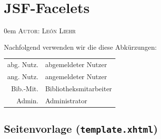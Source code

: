 \documentclass{article}
\makeatletter
\newcommand{\sectionauthor}[1]{
	{\parindent 0em \large \scshape Autor: #1 \par \nobreak \vspace*{1em}}
	\@afterheading
}
\makeatother
\begin{document}
\section{JSF-Facelets}
\sectionauthor{León Liehr}

\newcommand{\PUB}{jeder}
\newcommand{\USR}{ang. Nutz.}
\newcommand{\ANO}{abg. Nutz.}
\newcommand{\BIB}{Bib.-Mit.}
\newcommand{\ADM}{Admin.}

Nachfolgend verwenden wir die diese Abkürzungen:

\begin{table}[H]
\begin{tabular}{rl}
\toprule
\ANO & abgemeldeter Nutzer \\
\USR & angemeldeter Nutzer \\
\BIB & Bibliotheksmitarbeiter \\
\ADM & Administrator \\
\bottomrule
\end{tabular}
\end{table}

\newcommand{\facelet}[2]{\subsection{#1 (\texttt{#2.xhtml})}}

\newcommand{\BTN}{Knopf}
\newcommand{\LNK}{Hyperlink}
\newcommand{\INP}{Eingabefeld}
\newcommand{\DRP}{Drop-Down-Liste}
\newcommand{\TBL}{Tabelle}

\newenvironment{controls}
{
\begin{table}[H]
\begin{minipage}{\textwidth}
\renewcommand{\thefootnote}{\thempfootnote}
\begin{tabular}{llr}
\toprule
\textbf{Typ} & \textbf{Beschreibung} & \textbf{Sichtbarkeit}\\
\midrule
}{
\bottomrule
\end{tabular}
\end{minipage}
\end{table}
}

\facelet{Seitenvorlage}{template}
\end{document}
